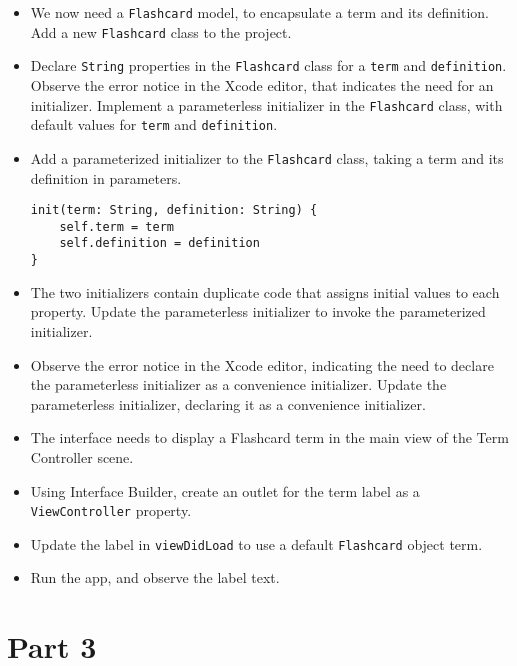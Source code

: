 \documentclass[a4paper,11pt]{scrartcl}
\begin{document}
\begin{itemize}
\item We now need a \texttt{Flashcard} model, to encapsulate a term and its definition. Add a new \texttt{Flashcard} class to the project.
\item Declare \texttt{String} properties in the \texttt{Flashcard} class for a \texttt{term} and \texttt{definition}. Observe the error notice in the Xcode editor, that indicates the need for an initializer. Implement a parameterless initializer in the \texttt{Flashcard} class, with default values for \texttt{term} and \texttt{definition}.
\item Add a parameterized initializer to the \texttt{Flashcard} class, taking a term and its definition in parameters.
\begin{lstlisting}
init(term: String, definition: String) {
	self.term = term
	self.definition = definition
}
\end{lstlisting}
\item The two initializers contain duplicate code that assigns initial values to each property. Update the parameterless initializer to invoke the parameterized initializer.
\item Observe the error notice in the Xcode editor, indicating the need to declare the parameterless initializer as a convenience initializer. Update the parameterless initializer, declaring it as a convenience initializer.
\item The interface needs to display a Flashcard term in the main view of the Term Controller scene.
\item Using Interface Builder, create an outlet for the term label as a \texttt{ViewController} property.
\item Update the label in \texttt{viewDidLoad} to use a default \texttt{Flashcard} object term.
\item Run the app, and observe the label text.
\end{itemize}

\section*{Part 3}
\end{document}
